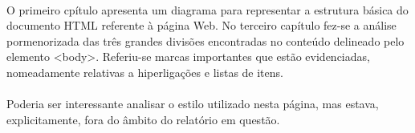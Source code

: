 \documentclass[a4paper,12pt,openright,oneside]{report}
\begin{document}
\paragraph*{}
O primeiro cpítulo apresenta um diagrama para representar a estrutura básica do documento HTML referente à página Web.
No terceiro capítulo fez-se a análise pormenorizada das três grandes divisões encontradas no conteúdo delineado pelo elemento <body>. Referiu-se marcas importantes que estão evidenciadas, nomeadamente relativas a hiperligações e listas de itens.
\paragraph*{}
Poderia ser interessante analisar o estilo utilizado nesta página, mas estava, explicitamente, fora do âmbito do relatório em questão.



 

\end{document}
